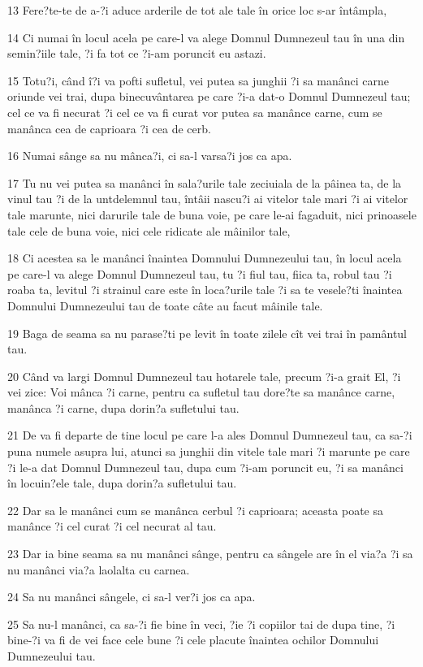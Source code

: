 \par 13 Fere?te-te de a-?i aduce arderile de tot ale tale în orice loc s-ar întâmpla,
\par 14 Ci numai în locul acela pe care-l va alege Domnul Dumnezeul tau în una din semin?iile tale, ?i fa tot ce ?i-am poruncit eu astazi.
\par 15 Totu?i, când î?i va pofti sufletul, vei putea sa junghii ?i sa manânci carne oriunde vei trai, dupa binecuvântarea pe care ?i-a dat-o Domnul Dumnezeul tau; cel ce va fi necurat ?i cel ce va fi curat vor putea sa manânce carne, cum se manânca cea de caprioara ?i cea de cerb.
\par 16 Numai sânge sa nu mânca?i, ci sa-l varsa?i jos ca apa.
\par 17 Tu nu vei putea sa manânci în sala?urile tale zeciuiala de la pâinea ta, de la vinul tau ?i de la untdelemnul tau, întâii nascu?i ai vitelor tale mari ?i ai vitelor tale marunte, nici darurile tale de buna voie, pe care le-ai fagaduit, nici prinoasele tale cele de buna voie, nici cele ridicate ale mâinilor tale,
\par 18 Ci acestea sa le manânci înaintea Domnului Dumnezeului tau, în locul acela pe care-l va alege Domnul Dumnezeul tau, tu ?i fiul tau, fiica ta, robul tau ?i roaba ta, levitul ?i strainul care este în loca?urile tale ?i sa te vesele?ti înaintea Domnului Dumnezeului tau de toate câte au facut mâinile tale.
\par 19 Baga de seama sa nu parase?ti pe levit în toate zilele cît vei trai în pamântul tau.
\par 20 Când va largi Domnul Dumnezeul tau hotarele tale, precum ?i-a grait El, ?i vei zice: Voi mânca ?i carne, pentru ca sufletul tau dore?te sa manânce carne, manânca ?i carne, dupa dorin?a sufletului tau.
\par 21 De va fi departe de tine locul pe care l-a ales Domnul Dumnezeul tau, ca sa-?i puna numele asupra lui, atunci sa junghii din vitele tale mari ?i marunte pe care ?i le-a dat Domnul Dumnezeul tau, dupa cum ?i-am poruncit eu, ?i sa manânci în locuin?ele tale, dupa dorin?a sufletului tau.
\par 22 Dar sa le manânci cum se manânca cerbul ?i caprioara; aceasta poate sa manânce ?i cel curat ?i cel necurat al tau.
\par 23 Dar ia bine seama sa nu manânci sânge, pentru ca sângele are în el via?a ?i sa nu manânci via?a laolalta cu carnea.
\par 24 Sa nu manânci sângele, ci sa-l ver?i jos ca apa.
\par 25 Sa nu-l manânci, ca sa-?i fie bine în veci, ?ie ?i copiilor tai de dupa tine, ?i bine-?i va fi de vei face cele bune ?i cele placute înaintea ochilor Domnului Dumnezeului tau.
